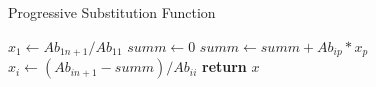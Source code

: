 \documentclass{article}
\begin{document}
  \begin{algorithm}
    \caption{Progressive Substitution Function}
    \begin{algorithmic}[1]
        \State $x_{1} \gets Ab_{1n+1} / Ab_{11}$
          \State $summ \gets 0$
            \State $summ \gets summ + Ab_{ip} * x_{p}$
          \EndFor
          \State $x_{i} \gets (Ab_{in+1} - summ) / Ab_{ii}$
        \EndFor
        \State \textbf{return} $x$
      \EndProcedure
    \end{algorithmic}
  \end{algorithm}
\end{document}
